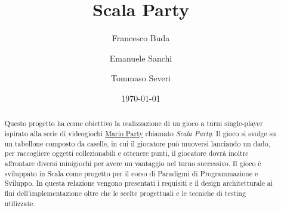 \documentclass[12pt, a4paper]{article}
\title{\LARGE Scala Party}
\author{
    Francesco Buda \\ \emailaddr{francesco.buda3@studio.unibo.it}
    \and
    Emanuele Sanchi \\ \emailaddr{emanuele.sanchi@studio.unibo.it}
    \and
    Tommaso Severi \\ \emailaddr{tommaso.severi2@studio.unibo.it}
}
\date{\today}
\begin{document}
\maketitle
\begin{abstract}
  Questo progetto ha come obiettivo la realizzazione di un gioco a turni single-player ispirato alla serie di videogiochi
  \href{https://it.wikipedia.org/wiki/Mario_Party_(serie)}{Mario Party} chiamato \textit{Scala Party}. Il gioco si svolge su
  un tabellone composto da caselle, in cui il giocatore può muoversi lanciando un dado, per raccogliere oggetti collezionabili 
  e ottenere punti, il giocatore dovrà inoltre affrontare diversi minigiochi per avere un vantaggio nel turno successivo.
  Il gioco è sviluppato in Scala come progetto per il corso di Paradigmi di Programmazione e Sviluppo. In questa relazione 
  vengono presentati i requisiti e il design architetturale ai fini dell'implementazione oltre che le scelte progettuali e 
  le tecniche di testing utilizzate.
\end{abstract}

\clearpage

\tableofcontents

\clearpage


\newpage


\newpage


\newpage


\newpage


\newpage


\newpage


\newpage



\end{document}
